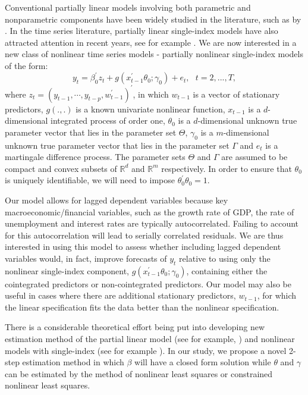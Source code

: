 \documentclass[a4paper,12pt,times,numbered,print,index]{report}
\numberwithin{equation}{section}
\begin{document}
	Conventional partially linear models involving both parametric and nonparametric components have been widely studied in the literature, such as by \cite{gao2007nonlinear}. In the time series literature, partially linear single-index models have also attracted attention in recent years, see for example \cite{dong2016estimation}. We are now interested in a new class of nonlinear time series models - partially nonlinear single-index models of the form:
	\begin{equation}
		y_{t} = \beta_0^{\prime} z_t + g\left( x_{t-1}^{\prime }\theta_0; \gamma_0\right) +e_{t},\ \ \
		t=2,...,T,  \label{PL model}
	\end{equation}%
	where $z_t = (y_{t-1}, \cdots, y_{t-p}, w_{t-1}^{\prime})^{\prime}$, in which $w_{t-1}$ is a vector of stationary predictors, 
	$g\left( .,.\right) $ is a known univariate nonlinear function, $x_{t-1}$ is a $d$-dimensional integrated process of order one, $\theta _{0}$ is a $d$-dimensional unknown true parameter vector that lies in the parameter set $\Theta $, $\gamma _{0}$ is a $m$-dimensional unknown true parameter vector that lies in the parameter set $\Gamma $ and $e_{t}$ is a martingale
	difference process. The parameter sets $\Theta $ and $\Gamma $ are assumed to be compact and convex subsets of $\mathbb{R}^{d}$ and $\mathbb{R}^{m}$ respectively. In order to ensure that $\theta_0$ is uniquely identifiable, we will need to impose $\theta_{0}^{\prime}\theta_{0} = 1$.
	
	Our model allows for lagged dependent variables because key macroeconomic/financial variables, such as the growth rate of GDP, the rate of unemployment and interest rates are typically autocorrelated. Failing to account for this autocorrelation will lead to serially correlated residuals. We are thus interested in using this model to assess whether including lagged dependent variables would, in fact, improve forecasts of $y_{t}$ relative to using only the nonlinear single-index component, $g\left( x_{t-1}^{\prime }\theta_0; \gamma_0\right)$, containing either the cointegrated predictors or non-cointegrated predictors. Our model may also be useful in cases where there are additional stationary predictors, $w_{t-1}$, for which the linear specification fits the data better than the nonlinear specification.
	
	There is a considerable theoretical effort being put into developing new estimation method of the partial linear model (see for example, \cite{dong2016estimation}) and nonlinear models with single-index (see for example \cite{chang2003index}). In our study, we propose a novel 2-step estimation method in which $\beta$ will have a closed form solution while $\theta$ and $\gamma$ can be estimated by the method of nonlinear least squares or constrained nonlinear least squares.
	
\end{document}
